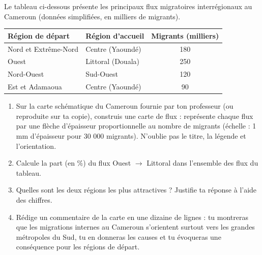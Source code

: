 \documentclass[11pt]{article}
\begin{document}
\begin{exercice}
Le tableau ci-dessous présente les principaux flux migratoires interrégionaux au Cameroun (données simplifiées, en milliers de migrants).

\begin{center}
\begin{tabularx}{\linewidth}{|X|X|c|}
\hline
\rowcolor{popblueL} \textbf{Région de départ} & \textbf{Région d'accueil} & \textbf{Migrants (milliers)} \\
\hline
Nord et Extrême-Nord & Centre (Yaoundé) & 180 \\
\hline
Ouest & Littoral (Douala) & 250 \\
\hline
Nord-Ouest & Sud-Ouest & 120 \\
\hline
Est et Adamaoua & Centre (Yaoundé) & 90 \\
\hline
\end{tabularx}
\end{center}

\begin{enumerate}
\item Sur la carte schématique du Cameroun fournie par ton professeur (ou reproduite sur ta copie), construis une carte de flux : représente chaque flux par une flèche d'épaisseur proportionnelle au nombre de migrants (échelle : 1 mm d'épaisseur pour 30 000 migrants). N'oublie pas le titre, la légende et l'orientation.
\item Calcule la part (en \%) du flux Ouest $\rightarrow$ Littoral dans l'ensemble des flux du tableau.
\item Quelles sont les deux régions les plus attractives ? Justifie ta réponse à l'aide des chiffres.
\item Rédige un commentaire de la carte en une dizaine de lignes : tu montreras que les migrations internes au Cameroun s'orientent surtout vers les grandes métropoles du Sud, tu en donneras les causes et tu évoqueras une conséquence pour les régions de départ.
\end{enumerate}
\end{exercice}
\end{document}
